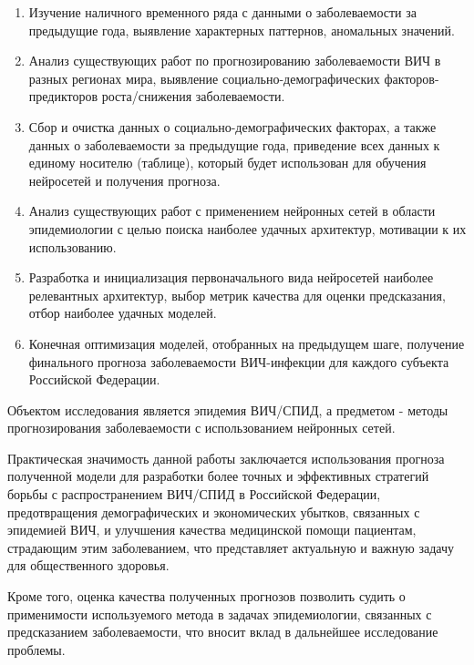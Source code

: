     \begin{enumerate}
        \item Изучение наличного временного ряда с данными о заболеваемости за предыдущие года, выявление характерных паттернов, аномальных значений.

        \item Анализ существующих работ по прогнозированию заболеваемости ВИЧ в разных регионах мира, выявление социально-демографических факторов-предикторов роста/снижения заболеваемости.

        \item Сбор и очистка данных о социально-демографических факторах, а также данных о заболеваемости за предыдущие года, приведение всех данных к единому носителю (таблице), который будет использован для обучения нейросетей и получения прогноза.

        \item Анализ существующих работ с применением нейронных сетей в области эпидемиологии с целью поиска наиболее удачных архитектур, мотивации к их использованию.

        \item Разработка и инициализация первоначального вида нейросетей наиболее релевантных архитектур, выбор метрик качества для оценки предсказания, отбор наиболее удачных моделей.

        \item Конечная оптимизация моделей, отобранных на предыдущем шаге, получение финального прогноза заболеваемости ВИЧ-инфекции для каждого субъекта Российской Федерации.


    \end{enumerate}
    
    Объектом исследования является эпидемия ВИЧ/СПИД, а предметом - методы прогнозирования заболеваемости с использованием нейронных сетей.
   
    Практическая значимость данной работы заключается использования прогноза полученной модели для разработки более точных и эффективных стратегий борьбы с распространением ВИЧ/СПИД в Российской Федерации, предотвращения демографических и экономических убытков, связанных с эпидемией ВИЧ, и улучшения качества медицинской помощи пациентам, страдающим этим заболеванием, что представляет актуальную и важную задачу для общественного здоровья.

    Кроме того, оценка качества полученных прогнозов позволить судить о применимости используемого метода в задачах эпидемиологии, связанных с предсказанием заболеваемости, что вносит вклад в дальнейшее исследование проблемы. 

\endinput